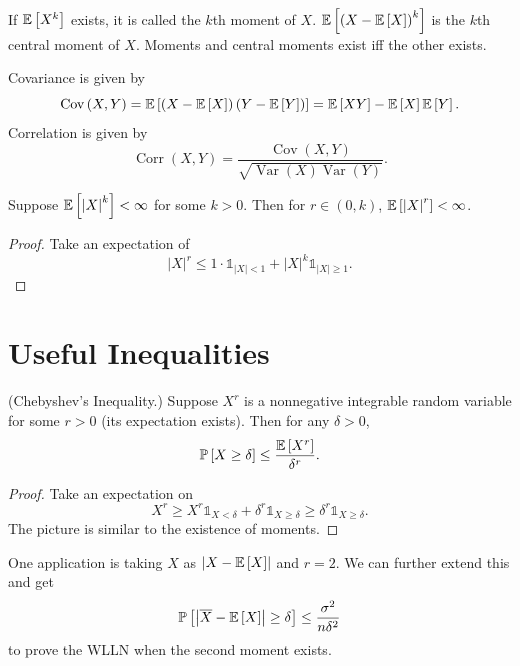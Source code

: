 \begin{definition}
	If $\mathbb{E}\left[X^k\right] $ exists, it is called the $k$th moment of $X$. $\mathbb{E}\left[\left( X- \mathbb{E}\left[X\right]  \right)^{k}\right] $ is the $k$th central moment of $X$. Moments and central moments exist iff the other exists.

	Covariance is given by \[
		\operatorname{Cov}\left(X,Y\right) = \mathbb{E}\left[\left( X-\mathbb{E}\left[X\right]  \right)\left( Y - \mathbb{E}\left[Y\right]  \right)\right] = \mathbb{E}\left[XY\right] - \mathbb{E}\left[X\right] \mathbb{E}\left[Y\right]
		.\] Correlation is given by \[
		\operatorname{Corr}\left(X,Y\right) = \frac{\operatorname{Cov}\left(X,Y\right)}{\sqrt{\operatorname{Var}\left(X\right)\operatorname{Var}\left(Y\right)} }
		.\]
\end{definition}

\begin{theorem} Suppose $\mathbb{E}\left[\left| X \right|^{k}\right] < \infty$ for some $k >0$. Then for $r \in (0,k)$, $\mathbb{E}\left[\left| X \right|^r\right] <\infty$.
\end{theorem}

\begin{proof}
	Take
	an expectation of \[
		\left| X \right|^r \le 1 \cdot \mathds{1}_{\left| X \right| < 1} + \left| X \right|^{k} \mathds{1}_{\left| X \right| \ge 1}
		.\]
\end{proof}

\section{Useful Inequalities}

\begin{theorem}	(Chebyshev's Inequality.) Suppose $X^r$ is a nonnegative integrable random variable for some $r>0$ (its expectation exists). Then for any $\delta > 0$, \[
		\mathbb{P}\left[X \ge \delta\right] \le \frac{\mathbb{E}\left[X^r\right] }{\delta^r}
		.\]
\end{theorem}

\begin{proof}
	Take an expectation on \[
		X^r \ge X^r \mathds{1}_{X < \delta} + \delta^r \mathds{1}_{X \ge \delta} \ge \delta^r \mathds{1}_{X \ge \delta}
		.\] The picture is similar to the existence of moments.
\end{proof}

\begin{example}	One application is taking $X$ as $\left| X - \mathbb{E}\left[X\right]  \right|$ and $r=2$. We can further extend this and get \[
		\mathbb{P}\left[\left| \overline{X} - \mathbb{E}\left[X\right]  \right| \ge \delta\right] \le \frac{\sigma^2}{n \delta^2}
	\] to prove the WLLN when the second moment exists.
\end{example}

